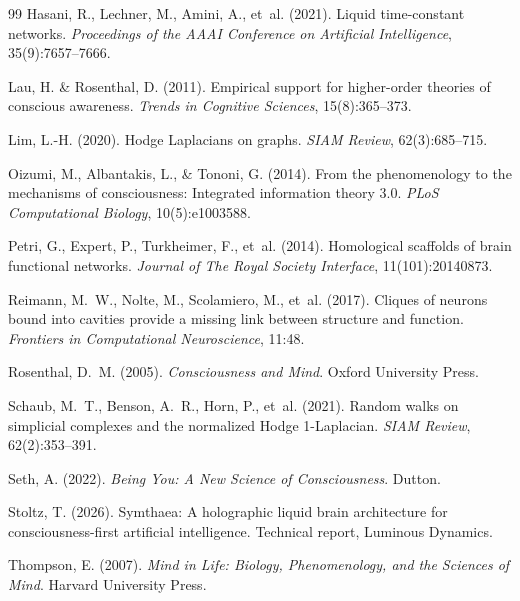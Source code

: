 \documentclass[11pt,a4paper]{article}
\begin{document}
\begin{thebibliography}{99}
Hasani, R., Lechner, M., Amini, A., et~al. (2021).
\newblock Liquid time-constant networks.
\newblock \emph{Proceedings of the AAAI Conference on Artificial Intelligence}, 35(9):7657--7666.

Lau, H. \& Rosenthal, D. (2011).
\newblock Empirical support for higher-order theories of conscious awareness.
\newblock \emph{Trends in Cognitive Sciences}, 15(8):365--373.

Lim, L.-H. (2020).
\newblock Hodge Laplacians on graphs.
\newblock \emph{SIAM Review}, 62(3):685--715.

Oizumi, M., Albantakis, L., \& Tononi, G. (2014).
\newblock From the phenomenology to the mechanisms of consciousness: Integrated information theory 3.0.
\newblock \emph{PLoS Computational Biology}, 10(5):e1003588.

Petri, G., Expert, P., Turkheimer, F., et~al. (2014).
\newblock Homological scaffolds of brain functional networks.
\newblock \emph{Journal of The Royal Society Interface}, 11(101):20140873.

Reimann, M.~W., Nolte, M., Scolamiero, M., et~al. (2017).
\newblock Cliques of neurons bound into cavities provide a missing link between structure and function.
\newblock \emph{Frontiers in Computational Neuroscience}, 11:48.

Rosenthal, D.~M. (2005).
\newblock \emph{Consciousness and Mind}.
\newblock Oxford University Press.

Schaub, M.~T., Benson, A.~R., Horn, P., et~al. (2021).
\newblock Random walks on simplicial complexes and the normalized Hodge 1-Laplacian.
\newblock \emph{SIAM Review}, 62(2):353--391.

Seth, A. (2022).
\newblock \emph{Being You: A New Science of Consciousness}.
\newblock Dutton.

Stoltz, T. (2026).
\newblock Symthaea: A holographic liquid brain architecture for consciousness-first artificial intelligence.
\newblock Technical report, Luminous Dynamics.

Thompson, E. (2007).
\newblock \emph{Mind in Life: Biology, Phenomenology, and the Sciences of Mind}.
\newblock Harvard University Press.


\end{thebibliography}
\end{document}
